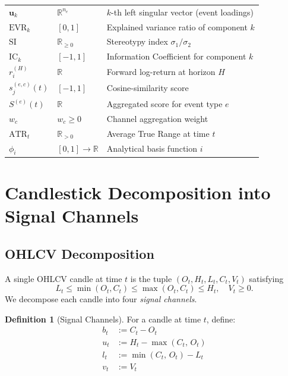 \documentclass[11pt,a4paper]{article}
\theoremstyle{definition}
\newtheorem{definition}{Definition}[section]
\theoremstyle{plain}
\newcommand{\R}{\mathbb{R}}
\newcommand{\bvec}[1]{\mathbf{#1}}
\begin{document}
\begin{center}
\begin{tabular}{lll}
$\bvec{u}_k$      & $\R^{n_e}$                    & $k$-th left singular vector (event loadings) \\
$\mathrm{EVR}_k$  & $[0,1]$                       & Explained variance ratio of component $k$ \\
$\mathrm{SI}$     & $\R_{\geq 0}$                 & Stereotypy index $\sigma_1/\sigma_2$ \\
$\mathrm{IC}_k$   & $[-1,1]$                      & Information Coefficient for component $k$ \\
$r_i^{(H)}$       & $\R$                          & Forward log-return at horizon $H$ \\
$s^{(e,c)}_j(t)$  & $[-1,1]$                      & Cosine-similarity score \\
$S^{(e)}(t)$      & $\R$                          & Aggregated score for event type $e$ \\
$w_c$             & $w_c \geq 0$                  & Channel aggregation weight \\
$\mathrm{ATR}_t$  & $\R_{>0}$                     & Average True Range at time $t$ \\
$\phi_i$          & $[0,1] \to \R$                & Analytical basis function $i$ \\
\hline
\end{tabular}
\end{center}

\section{Candlestick Decomposition into Signal Channels}
\label{sec:channels}

\subsection{OHLCV Decomposition}

A single OHLCV candle at time $t$ is the tuple $(O_t, H_t, L_t, C_t, V_t)$
satisfying
\begin{equation}
    L_t \leq \min(O_t, C_t) \leq \max(O_t, C_t) \leq H_t, \quad V_t \geq 0.
    \label{eq:ohlcv_constraint}
\end{equation}
We decompose each candle into four \emph{signal channels}.

\begin{definition}[Signal Channels]
\label{def:channels}
For a candle at time $t$, define:
\begin{align}
    b_t &:= C_t - O_t
          \label{eq:body} \\
    u_t &:= H_t - \max(C_t,\, O_t)
          \label{eq:upper_wick} \\
    l_t &:= \min(C_t,\, O_t) - L_t
          \label{eq:lower_wick} \\
    v_t &:= V_t
          \label{eq:volume_channel}
\end{align}
\end{definition}
\end{document}

